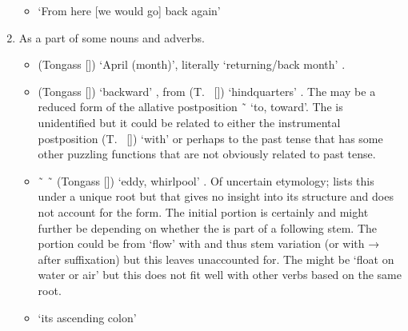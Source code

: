 \begin{morphdesc}[resume*=alphalist]
\begin{enumerate}
\begin{itemize}
			\parencite[204.769]{nyman-leer:1993}
		\item	{} ‘From here [we would go] back again’
			\parencite[212.956]{nyman-leer:1993}
		\end{itemize}
	\item	As a part of some nouns and adverbs.
		\begin{itemize}
		\item	{} 
				(Tongass  [])
				‘April (month)’,
				literally ‘returning/back month’
				\parencite[f01/122]{leer:1973}.
		\item	{} 
				(Tongass  [])
				‘backward’
				\parencite[f01/122]{leer:1973},
				from  (T.\  []) ‘hindquarters’
				\parencite[f04/135]{leer:1973}.
			The  may be a reduced form of the allative postposition
				 \~\  ‘to, toward’.
			The  is unidentified but it could be related to either the
				instrumental postposition  (T.\  []) ‘with’
				or perhaps to the past tense  that has some other
				puzzling functions that are not obviously related to past tense.
		\item	{} \~\  \~\ 
				(Tongass  [])
				 ‘eddy, whirlpool’
				 \parencites[04/192]{leer:1973}[19]{leer:1978b}[M·91]{leer-hitch-ritter:2001}.
			Of uncertain etymology; \textcites{leer:1973}{leer:1978b} lists this under a
				unique root 
				but that gives no insight into its structure
				and does not account for the  form.
			The initial portion is certainly 
				and might further be 
				depending on whether the  is part of a following stem.
			The  portion could be from  ‘flow’
				\parencites[05/1]{leer:1973}[313]{leer:1976}
				with  and thus  stem variation
				(or  with → after suffixation)
				but this leaves  unaccounted for.
			The  might be  ‘float on water or air’
				\parencites[03/299]{leer:1973}[235]{leer:1976}
				but this does not fit well with other verbs based on the same root.
		\item	{} ‘its ascending colon’
			\parencite[M·122]{leer-hitch-ritter:2001}
		\end{itemize}
	\end{enumerate}



\end{morphdesc}
